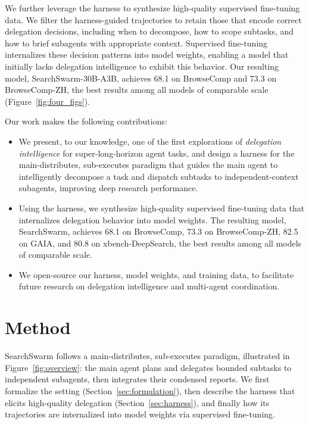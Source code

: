 \documentclass{llmxive}
\begin{document}
We further leverage the harness to synthesize high-quality supervised fine-tuning data. We filter the harness-guided trajectories to retain those that encode correct delegation decisions, including when to decompose, how to scope subtasks, and how to brief subagents with appropriate context. Supervised fine-tuning internalizes these decision patterns into model weights, enabling a model that initially lacks delegation intelligence to exhibit this behavior. Our resulting model, SearchSwarm-30B-A3B, achieves 68.1 on BrowseComp and 73.3 on BrowseComp-ZH, the best results among all models of comparable scale (Figure~\ref{fig:four_figs}).

Our work makes the following contributions:
\begin{itemize}[leftmargin=*]
\item We present, to our knowledge, one of the first explorations of \emph{delegation intelligence} for super-long-horizon agent tasks, and design a harness for the main-distributes, sub-executes paradigm that guides the main agent to intelligently decompose a task and dispatch subtasks to independent-context subagents, improving deep research performance.
\item Using the harness, we synthesize high-quality supervised fine-tuning data that internalizes delegation behavior into model weights. The resulting model, SearchSwarm, achieves 68.1 on BrowseComp, 73.3 on BrowseComp-ZH, 82.5 on GAIA, and 80.8 on xbench-DeepSearch, the best results among all models of comparable scale.
\item We open-source our harness, model weights, and training data, to facilitate future research on delegation intelligence and multi-agent coordination.
\end{itemize}
\section{Method}
\label{sec:method}

SearchSwarm follows a main-distributes, sub-executes paradigm, illustrated in Figure~\ref{fig:overview}: the main agent plans and delegates bounded subtasks to independent subagents, then integrates their condensed reports. We first formalize the setting (Section~\ref{sec:formulation}), then describe the harness that elicits high-quality delegation (Section~\ref{sec:harness}), and finally how its trajectories are internalized into model weights via supervised fine-tuning.
\end{document}
